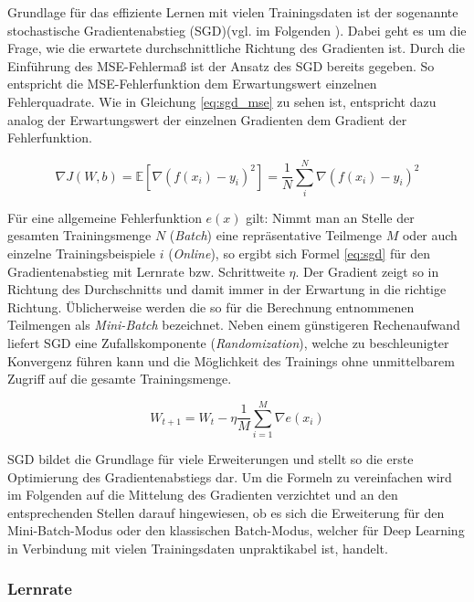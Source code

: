 Grundlage für das effiziente Lernen mit vielen Trainingsdaten ist der sogenannte stochastische Gradientenabstieg (SGD)(vgl. im Folgenden \cite{Bottou1998}). Dabei geht es um die Frage, wie die erwartete durchschnittliche Richtung des Gradienten ist. Durch die Einführung des MSE-Fehlermaß ist der Ansatz des SGD bereits gegeben. So entspricht die MSE-Fehlerfunktion dem Erwartungswert einzelnen Fehlerquadrate. Wie in Gleichung \ref{eq:sgd_mse} zu sehen ist, entspricht dazu analog der Erwartungswert der einzelnen Gradienten dem Gradient der Fehlerfunktion.

\begin{equation}
\label{eq:sgd_mse} 
\nabla J(W,b) =  \mathbb{E}[\nabla (f(x_i) - y_i)^2] = \frac{1}{N}\sum_{i}^{N} \nabla (f(x_i) - y_i)^2
\end{equation}

Für eine allgemeine Fehlerfunktion $e(x)$ gilt: Nimmt man an Stelle der gesamten Trainingsmenge $N$ (\textit{Batch}) eine repräsentative Teilmenge $M$ oder auch einzelne Trainingsbeispiele $i$ (\textit{Online}), so ergibt sich Formel \ref{eq:sgd} für den Gradientenabstieg mit Lernrate bzw. Schrittweite $\eta$. Der Gradient zeigt so in Richtung des Durchschnitts und damit immer in der Erwartung in die richtige Richtung. Üblicherweise werden die so für die Berechnung entnommenen Teilmengen als \textit{Mini-Batch} bezeichnet. Neben einem günstigeren Rechenaufwand liefert SGD eine Zufallskomponente (\textit{Randomization}), welche zu beschleunigter Konvergenz führen kann und die Möglichkeit des Trainings ohne unmittelbarem Zugriff auf die gesamte Trainingsmenge. 

\begin{equation}
\label{eq:sgd} 
W_{t+1} = W_t - \eta \frac{1}{M} \sum_{i=1}^{M} \nabla e(x_i)
\end{equation}

SGD bildet die Grundlage für viele Erweiterungen und stellt so die erste Optimierung des Gradientenabstiegs dar. 
Um die Formeln zu vereinfachen wird im Folgenden auf die Mittelung des Gradienten verzichtet und an den entsprechenden Stellen darauf hingewiesen, ob es sich die Erweiterung für den Mini-Batch-Modus oder den klassischen Batch-Modus, welcher für Deep Learning in Verbindung mit vielen Trainingsdaten unpraktikabel ist, handelt. 

\subsubsection{Lernrate}

